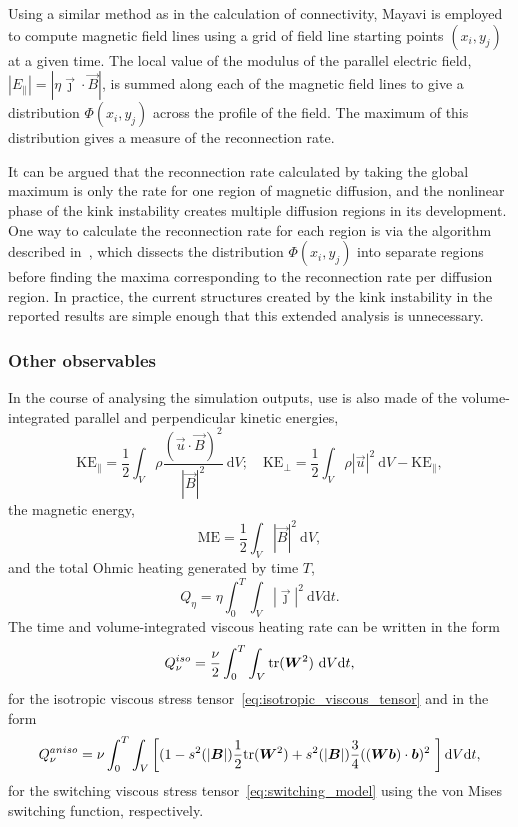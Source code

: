 Using a similar method as in the calculation of connectivity, Mayavi is employed to compute magnetic field lines using a grid of field line starting points $(x_i, y_j)$ at a given time. The local value of the modulus of the parallel electric field, $|E_{\parallel}| = |\eta \vec{\jmath} \cdot \vec{B}|$, is summed along each of the magnetic field lines to give a distribution $\Phi(x_i, y_j)$ across the profile of the field. The maximum of this distribution gives a measure of the reconnection rate.

It can be argued that the reconnection rate calculated by taking the global maximum is only the rate for one region of magnetic diffusion, and the nonlinear phase of the kink instability creates multiple diffusion regions in its development. One way to calculate the reconnection rate for each region is via the algorithm described in~\cite{pontinDynamicsBraidedCoronal2011}, which dissects the distribution $\Phi(x_i, y_j)$ into separate regions before finding the maxima corresponding to the reconnection rate per diffusion region. In practice, the current structures created by the kink instability in the reported results are simple enough that this extended analysis is unnecessary.

\subsubsection{Other observables}

In the course of analysing the simulation outputs, use is also made of the volume-integrated parallel and perpendicular kinetic energies,
\begin{equation}
  \label{eq:kinetic_energies}
  \text{KE}_{\parallel} = \frac{1}{2} \int_V \rho\frac{(\vec{u}\cdot\vec{B})^2}{|\vec{B}|^2}\ \text{d}V; \quad
  \text{KE}_{\perp} = \frac{1}{2} \int_V \rho|\vec{u}|^2\ \text{d}V - \text{KE}_{\parallel},
\end{equation}
the magnetic energy,
\begin{equation}
  \label{eq:magnetic_energy}
   \text{ME} = \frac12\int_V |\vec{B}|^2\ \text{d}V,
\end{equation}
and the total Ohmic heating generated by time $T$,
\begin{equation}
  \label{eq:ohmic_heating}
  Q_{\eta} = \eta \int_0^{T} \int_V |\vec{\jmath}|^2\ \text{d}V \text{d}t.
\end{equation}
The time and volume-integrated viscous heating rate can be written
in the form
\begin{equation}
  \label{eq:iso_viscous_heating}
  Q_{\nu}^{iso} = \frac{\nu}{2} \int_0^T \int_V
  \text{tr}({\bm W}^2)\  \text{d}V \text{d}t,
\end{equation}
for the isotropic viscous stress
tensor~\eqref{eq:isotropic_viscous_tensor} and in the form
\begin{equation}
  \label{eq:aniso_viscous_heating}
  Q_{\nu}^{aniso} = \nu \int_0^T \int_V \left[ (1-s^2(|{\bm B}|)\frac{1}{2}\text{tr}({\bm W}^2) + s^2(|{\bm B}|)\frac{3 }{4} (({\bm W} {\bm b}) \cdot {\bm b})^2\ \right] \text{d}V \text{d}t,
\end{equation}
for the switching viscous stress tensor~\eqref{eq:switching_model} using the von Mises switching function, respectively.

